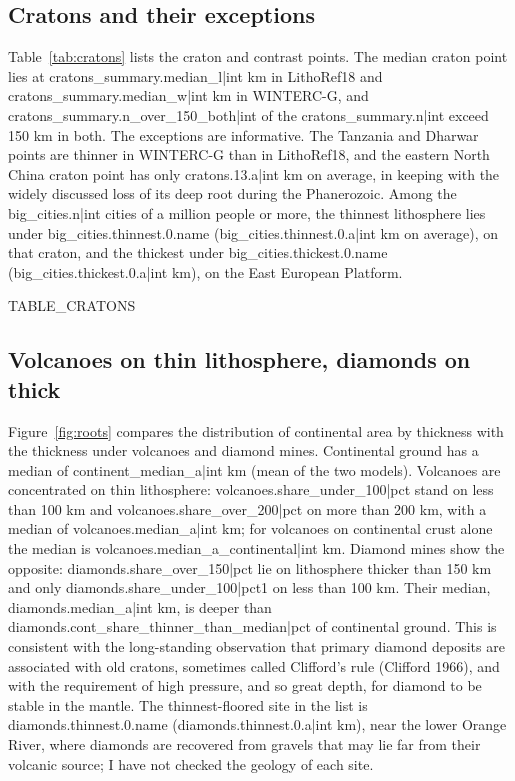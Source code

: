 \documentclass[11pt,a4paper]{article}
\begin{document}
\subsection{Cratons and their exceptions}

Table~\ref{tab:cratons} lists the craton and contrast points. The median craton point lies at {{cratons_summary.median_l|int}} km in LithoRef18 and {{cratons_summary.median_w|int}} km in WINTERC-G, and {{cratons_summary.n_over_150_both|int}} of the {{cratons_summary.n|int}} exceed 150 km in both. The exceptions are informative. The Tanzania and Dharwar points are thinner in WINTERC-G than in LithoRef18, and the eastern North China craton point has only {{cratons.13.a|int}} km on average, in keeping with the widely discussed loss of its deep root during the Phanerozoic. Among the {{big_cities.n|int}} cities of a million people or more, the thinnest lithosphere lies under {{big_cities.thinnest.0.name}} ({{big_cities.thinnest.0.a|int}} km on average), on that craton, and the thickest under {{big_cities.thickest.0.name}} ({{big_cities.thickest.0.a|int}} km), on the East European Platform.

{{TABLE_CRATONS}}

\subsection{Volcanoes on thin lithosphere, diamonds on thick}

Figure~\ref{fig:roots} compares the distribution of continental area by thickness with the thickness under volcanoes and diamond mines. Continental ground has a median of {{continent_median_a|int}} km (mean of the two models). Volcanoes are concentrated on thin lithosphere: {{volcanoes.share_under_100|pct}} stand on less than 100 km and {{volcanoes.share_over_200|pct}} on more than 200 km, with a median of {{volcanoes.median_a|int}} km; for volcanoes on continental crust alone the median is {{volcanoes.median_a_continental|int}} km. Diamond mines show the opposite: {{diamonds.share_over_150|pct}} lie on lithosphere thicker than 150 km and only {{diamonds.share_under_100|pct1}} on less than 100 km. Their median, {{diamonds.median_a|int}} km, is deeper than {{diamonds.cont_share_thinner_than_median|pct}} of continental ground. This is consistent with the long-standing observation that primary diamond deposits are associated with old cratons, sometimes called Clifford's rule (Clifford 1966), and with the requirement of high pressure, and so great depth, for diamond to be stable in the mantle. The thinnest-floored site in the list is {{diamonds.thinnest.0.name}} ({{diamonds.thinnest.0.a|int}} km), near the lower Orange River, where diamonds are recovered from gravels that may lie far from their volcanic source; I have not checked the geology of each site.
\end{document}
